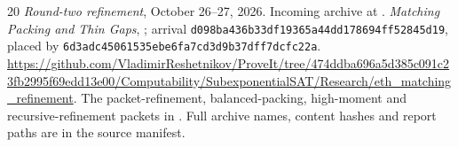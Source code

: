 \documentclass[11pt,letterpaper]{article}
\theoremstyle{definition}\newtheorem{definition}[theorem]{Definition}
\theoremstyle{remark}\newtheorem{remark}[theorem]{Remark}
\begin{document}
\begin{thebibliography}{20}
 \emph{Round-two refinement}, October 26--27, 2026.
Incoming archive  at \cite{incoming}.
 \emph{Matching Packing and Thin Gaps},
; arrival
\texttt{d098ba436b33df19365a44dd178694ff52845d19}, placed by
\texttt{6d3adc45061535ebe6fa7cd3d9b37dff7dcfc22a}.\newline
\url{https://github.com/VladimirReshetnikov/ProveIt/tree/474ddba696a5d385c091c23fb2995f69edd13e00/Computability/SubexponentialSAT/Research/eth_matching_refinement}.
 The packet-refinement, balanced-packing,
high-moment and recursive-refinement packets in \cite{incoming}.
Full archive names, content hashes and report paths are in the source manifest.
\end{thebibliography}
\end{document}
